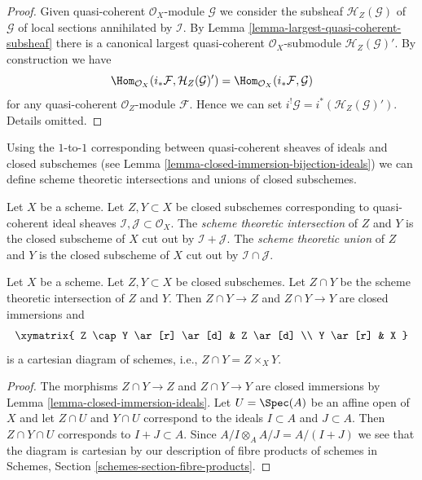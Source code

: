 \begin{proof}
Given quasi-coherent $\mathcal{O}_X$-module $\mathcal{G}$ we consider
the subsheaf $\mathcal{H}_Z(\mathcal{G})$ of $\mathcal{G}$ of local sections
annihilated by $\mathcal{I}$. By
Lemma \ref{lemma-largest-quasi-coherent-subsheaf}
there is a canonical largest quasi-coherent $\mathcal{O}_X$-submodule
$\mathcal{H}_Z(\mathcal{G})'$. By construction we have
$$
\Hom_{\mathcal{O}_X}(i_*\mathcal{F}, \mathcal{H}_Z(\mathcal{G})')
=
\Hom_{\mathcal{O}_X}(i_*\mathcal{F}, \mathcal{G})
$$
for any quasi-coherent $\mathcal{O}_Z$-module $\mathcal{F}$.
Hence we can set $i^!\mathcal{G} = i^*(\mathcal{H}_Z(\mathcal{G})')$.
Details omitted.
\end{proof}

\noindent
Using the $1$-to-$1$ corresponding between quasi-coherent sheaves
of ideals and closed subschemes (see
Lemma \ref{lemma-closed-immersion-bijection-ideals})
we can define scheme theoretic intersections and unions
of closed subschemes.

\begin{definition}
\label{definition-scheme-theoretic-intersection-union}
Let $X$ be a scheme. Let $Z, Y \subset X$ be closed subschemes
corresponding to quasi-coherent ideal sheaves
$\mathcal{I}, \mathcal{J} \subset \mathcal{O}_X$.
The {\it scheme theoretic intersection} of $Z$ and $Y$
is the closed subscheme of $X$ cut out by $\mathcal{I} + \mathcal{J}$.
The {\it scheme theoretic union} of $Z$ and $Y$
is the closed subscheme of $X$ cut out by
$\mathcal{I} \cap \mathcal{J}$.
\end{definition}

\begin{lemma}
\label{lemma-scheme-theoretic-intersection}
Let $X$ be a scheme. Let $Z, Y \subset X$ be closed subschemes.
Let $Z \cap Y$ be the scheme theoretic intersection of $Z$ and $Y$.
Then $Z \cap Y \to Z$ and $Z \cap Y \to Y$ are closed immersions
and
$$
\xymatrix{
Z \cap Y \ar[r] \ar[d] & Z \ar[d] \\
Y \ar[r] & X
}
$$
is a cartesian diagram of schemes, i.e., $Z \cap Y = Z \times_X Y$.
\end{lemma}

\begin{proof}
The morphisms $Z \cap Y \to Z$ and $Z \cap Y \to Y$ are closed immersions
by Lemma \ref{lemma-closed-immersion-ideals}.
Let $U = \Spec(A)$ be an affine open of $X$ and let $Z \cap U$ and $Y \cap U$
correspond to the ideals $I \subset A$ and $J \subset A$. Then
$Z \cap Y \cap U$ corresponds to $I + J \subset A$. Since
$A/I \otimes_A A/J = A/(I + J)$ we see that the diagram is
cartesian by our description of fibre products of schemes
in Schemes, Section \ref{schemes-section-fibre-products}.
\end{proof}

